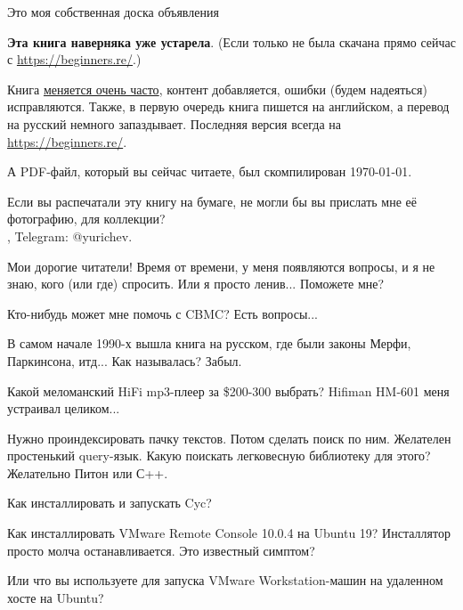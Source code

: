 
\begin{center}
\LARGE{} Это моя собственная доска объявления \normalsize{}
\end{center}

\textbf{Эта книга наверняка уже устарела}.
(Если только не была скачана прямо сейчас с \url{https://beginners.re/}.)

Книга \href{https://github.com/DennisYurichev/RE-for-beginners/commits/master}{меняется очень часто},
контент добавляется, ошибки (будем надеяться) исправляются.
Также, в первую очередь книга пишется на английском, а перевод на русский немного запаздывает.
Последняя версия всегда на \url{https://beginners.re/}.

А PDF-файл, который вы сейчас читаете, был скомпилирован \today{}.

\myhrule{}

Если вы распечатали эту книгу на бумаге, не могли бы вы прислать мне её фотографию, для коллекции?\\
\EMAIL{}, Telegram: @yurichev.

\myhrule{}

Мои дорогие читатели! Время от времени, у меня появляются вопросы, и я не знаю, кого (или где) спросить.
Или я просто ленив...
Поможете мне?

\myhrule{}

Кто-нибудь может мне помочь с CBMC? Есть вопросы...

\myhrule{}

В самом начале 1990-х вышла книга на русском, где были законы Мерфи, Паркинсона, итд...
Как называлась?
Забыл.

\myhrule{}

Какой меломанский HiFi mp3-плеер за \$200-300 выбрать?
Hifiman HM-601 меня устраивал целиком...

\myhrule{}

Нужно проиндексировать пачку текстов. Потом сделать поиск по ним. Желателен простенький query-язык.
Какую поискать легковесную библиотеку для этого?
Желательно Питон или С++.

\myhrule{}

Как инсталлировать и запускать Cyc?

\myhrule{}

Как инсталлировать VMware Remote Console 10.0.4 на Ubuntu 19? Инсталлятор просто молча останавливается. Это известный симптом?

Или что вы используете для запуска VMware Workstation-машин на удаленном хосте на Ubuntu?

